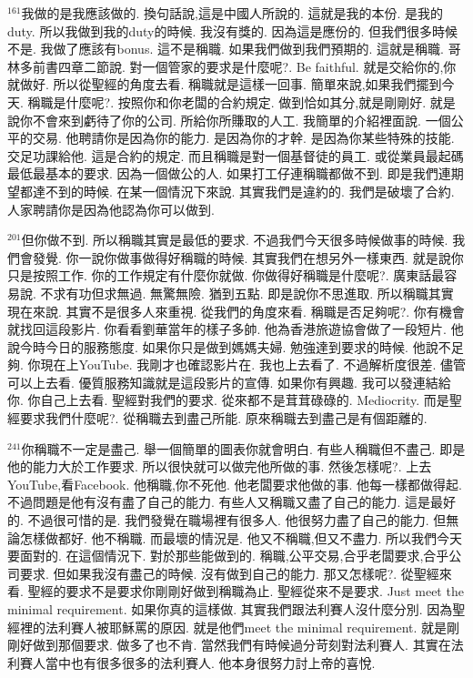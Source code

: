 \documentclass{book}
\begin{document}
$^{161}$我做的是我應該做的.
換句話說,這是中國人所說的.
這就是我的本份.
是我的duty.
所以我做到我的duty的時候.
我沒有獎的.
因為這是應份的.
但我們很多時候不是.
我做了應該有bonus.
這不是稱職.
如果我們做到我們預期的.
這就是稱職.
哥林多前書四章二節說.
對一個管家的要求是什麼呢?.
Be faithful.
就是交給你的,你就做好.
所以從聖經的角度去看.
稱職就是這樣一回事.
簡單來說,如果我們擺到今天.
稱職是什麼呢?.
按照你和你老闆的合約規定.
做到恰如其分,就是剛剛好.
就是說你不會來到虧待了你的公司.
所給你所賺取的人工.
我簡單的介紹裡面說.
一個公平的交易.
他聘請你是因為你的能力.
是因為你的才幹.
是因為你某些特殊的技能.
交足功課給他.
這是合約的規定.
而且稱職是對一個基督徒的員工.
或從業員最起碼最低最基本的要求.
因為一個做公的人.
如果打工仔連稱職都做不到.
即是我們連期望都達不到的時候.
在某一個情況下來說.
其實我們是違約的.
我們是破壞了合約.
人家聘請你是因為他認為你可以做到.

$^{201}$但你做不到.
所以稱職其實是最低的要求.
不過我們今天很多時候做事的時候.
我們會發覺.
你一說你做事做得好稱職的時候.
其實我們在想另外一樣東西.
就是說你只是按照工作.
你的工作規定有什麼你就做.
你做得好稱職是什麼呢?.
廣東話最容易說.
不求有功但求無過.
無驚無險.
猶到五點.
即是說你不思進取.
所以稱職其實現在來說.
其實不是很多人來重視.
從我們的角度來看.
稱職是否足夠呢?.
你有機會就找回這段影片.
你看看劉華當年的樣子多帥.
他為香港旅遊協會做了一段短片.
他說今時今日的服務態度.
如果你只是做到媽媽夫婦.
勉強達到要求的時候.
他說不足夠.
你現在上YouTube.
我剛才也確認影片在.
我也上去看了.
不過解析度很差.
儘管可以上去看.
優質服務知識就是這段影片的宣傳.
如果你有興趣.
我可以發連結給你.
你自己上去看.
聖經對我們的要求.
從來都不是茸茸碌碌的.
Mediocrity.
而是聖經要求我們什麼呢?.
從稱職去到盡己所能.
原來稱職去到盡己是有個距離的.

$^{241}$你稱職不一定是盡己.
舉一個簡單的圖表你就會明白.
有些人稱職但不盡己.
即是他的能力大於工作要求.
所以很快就可以做完他所做的事.
然後怎樣呢?.
上去YouTube,看Facebook.
他稱職,你不死他.
他老闆要求他做的事.
他每一樣都做得起.
不過問題是他有沒有盡了自己的能力.
有些人又稱職又盡了自己的能力.
這是最好的.
不過很可惜的是.
我們發覺在職場裡有很多人.
他很努力盡了自己的能力.
但無論怎樣做都好.
他不稱職.
而最壞的情況是.
他又不稱職,但又不盡力.
所以我們今天要面對的.
在這個情況下.
對於那些能做到的.
稱職,公平交易,合乎老闆要求,合乎公司要求.
但如果我沒有盡己的時候.
沒有做到自己的能力.
那又怎樣呢?.
從聖經來看.
聖經的要求不是要求你剛剛好做到稱職為止.
聖經從來不是要求.
Just meet the minimal requirement.
如果你真的這樣做.
其實我們跟法利賽人沒什麼分別.
因為聖經裡的法利賽人被耶穌罵的原因.
就是他們meet the minimal requirement.
就是剛剛好做到那個要求.
做多了也不肯.
當然我們有時候過分苛刻對法利賽人.
其實在法利賽人當中也有很多很多的法利賽人.
他本身很努力討上帝的喜悅.
\end{document}
